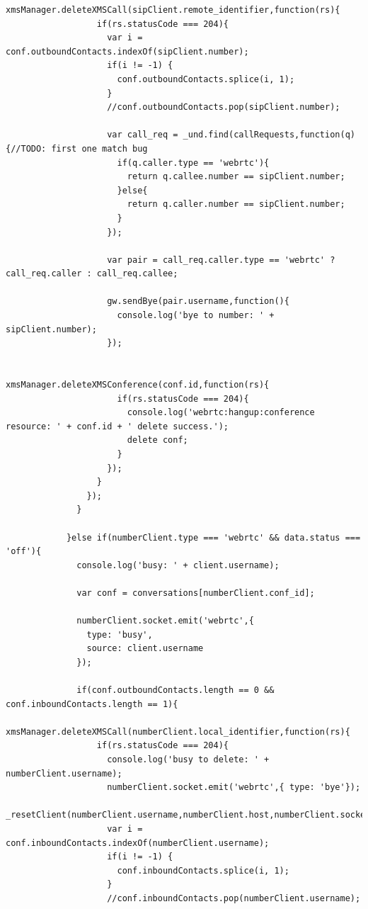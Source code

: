 \begin{appendices}
\begin{lstlisting}[caption={socket.js on Application Server},label={code:server_socket}]
                xmsManager.deleteXMSCall(sipClient.remote_identifier,function(rs){
                  if(rs.statusCode === 204){
                    var i = conf.outboundContacts.indexOf(sipClient.number);
                    if(i != -1) {
                      conf.outboundContacts.splice(i, 1);
                    }
                    //conf.outboundContacts.pop(sipClient.number);

                    var call_req = _und.find(callRequests,function(q){//TODO: first one match bug
                      if(q.caller.type == 'webrtc'){
                        return q.callee.number == sipClient.number;
                      }else{
                        return q.caller.number == sipClient.number;
                      }
                    });

                    var pair = call_req.caller.type == 'webrtc' ? call_req.caller : call_req.callee;

                    gw.sendBye(pair.username,function(){
                      console.log('bye to number: ' + sipClient.number);
                    });

                    xmsManager.deleteXMSConference(conf.id,function(rs){
                      if(rs.statusCode === 204){
                        console.log('webrtc:hangup:conference resource: ' + conf.id + ' delete success.');
                        delete conf;
                      }
                    });
                  }
                });
              }

            }else if(numberClient.type === 'webrtc' && data.status === 'off'){
              console.log('busy: ' + client.username);

              var conf = conversations[numberClient.conf_id];

              numberClient.socket.emit('webrtc',{ 
                type: 'busy',
                source: client.username
              });

              if(conf.outboundContacts.length == 0 && conf.inboundContacts.length == 1){
                xmsManager.deleteXMSCall(numberClient.local_identifier,function(rs){
                  if(rs.statusCode === 204){
                    console.log('busy to delete: ' + numberClient.username);
                    numberClient.socket.emit('webrtc',{ type: 'bye'});
                    _resetClient(numberClient.username,numberClient.host,numberClient.socket,numberClient.delivery);
                    var i = conf.inboundContacts.indexOf(numberClient.username);
                    if(i != -1) {
                      conf.inboundContacts.splice(i, 1);
                    }
                    //conf.inboundContacts.pop(numberClient.username);


\end{lstlisting}
\end{appendices}
